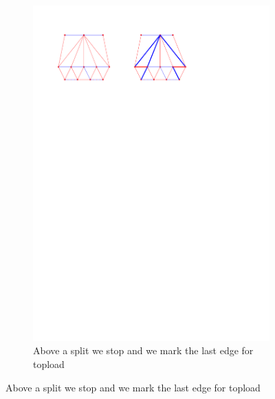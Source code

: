 \begin{figure}
\begin{subfigure}[b]{0.45 \textwidth}
    \end{subfigure}
    \centering
    \begin{subfigure}[b]{0.45 \textwidth}
        \includegraphics[width = \textwidth]{topFanFlips/img/split}
        \caption{Above a split we stop and we mark the last edge for topload}
        \label{fig:fanflip:split}


\end{subfigure}
\end{figure}
